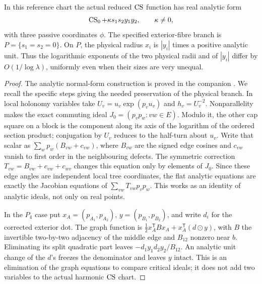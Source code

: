 \begin{lemma}\label{lem:cs}
In this reference chart the actual reduced \(\operatorname{CS}\) function has real analytic form
\begin{equation}\label{eq:quartic}
 \operatorname{CS}_0+\kappa s_1s_2 y_1y_2,\qquad \kappa\ne0,
\end{equation}
with three passive coordinates \(\phi\). The specified exterior-fibre branch is \(P=\{s_1=s_2=0\}\). On \(P\), the physical radius \(x_i\) is \(|y_i|\) times a positive analytic unit. Thus the logarithmic exponents of the two physical radii and of \(|y_i|\) differ by \(O(1/\log\lambda)\), uniformly even when their sizes are very unequal.
\end{lemma}
\begin{proof}
The analytic normal-form construction is proved in the companion \cite{CSNF}. We recall the specific steps giving the needed preservation of the physical branch. In local holonomy variables take \(U_v=u_v\exp(p_vu_v)\) and \(h_v=U_v^{-2}\). Nonparallelity makes the exact commuting ideal \(J_0=(p_vp_w:vw\in E)\). Modulo it, the other cap square on a block is the component along its axis of the logarithm of the ordered section product; conjugation by \(U_v\) reduces to the half-turn about \(u_v\). Write that scalar as \(\sum_w p_w(B_{vw}+c_{vw})\), where \(B_{vw}\) are the signed edge cosines and \(c_{vw}\) vanish to first order in the neighbouring defects. The symmetric correction \(T_{vw}=B_{vw}+c_{vw}+c_{wv}\) changes this equation only by elements of \(J_0\). Since these edge angles are independent local tree coordinates, the flat analytic equations are exactly the Jacobian equations of \(\sum_{vw}T_{vw}p_vp_w\). This works as an identity of analytic ideals, not only on real points.

In the \(P_4\) case put \(x_A=(p_{A_1},p_{A_2})\), \(y=(p_{B_1},p_{B_2})\), and write \(d_i\) for the corrected exterior dot. The graph function is \(\tfrac12 x_A^{\mathsf T}B x_A+x_A^{\mathsf T}(d\odot y)\), with \(B\) the invertible two-by-two adjacency of the middle edge and \(B_{12}\) nonzero near \(b\). Eliminating its split quadratic part leaves \(-d_1y_1d_2y_2/B_{12}\). An analytic unit change of the \(d\)'s freezes the denominator and leaves \(y\) intact. This is an elimination of the graph equations to compare critical ideals; it does not add two variables to the actual harmonic \(\operatorname{CS}\) chart.


\end{proof}
